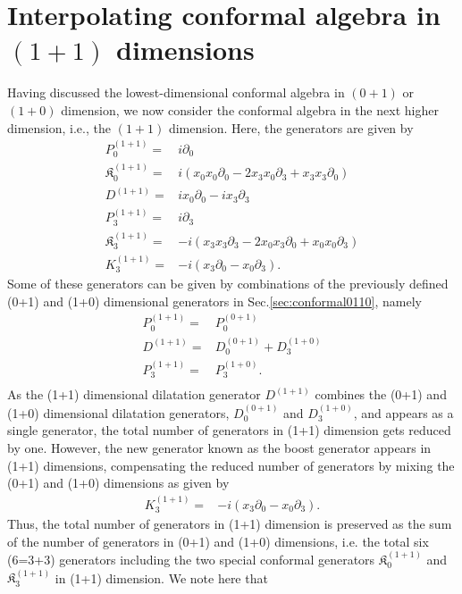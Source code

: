 \documentclass[%
 reprint,
superscriptaddress,
 amsmath,amssymb,
 aps,
]{revtex4-2}
\begin{document}
\section{Interpolating conformal algebra in \texorpdfstring{$(1+1)$}{Lg} dimensions}
\label{sec:conformal}
Having discussed the lowest-dimensional conformal algebra in $(0+1)$ or $(1+0)$ dimension, we now consider the conformal algebra in the next higher dimension, i.e., the $(1+1)$ dimension. Here, the generators are given by
\begin{align}
    P^{(1+1)}_{0}=&i\partial_{0}\\
    \mathfrak{K}^{(1+1)}_{{0}}=&i(x_{0}x_{0}\partial_{{0}}-2x_{3}x_{0}\partial_{3}+x_{3}x_{3}\partial_{0})\\
    D^{(1+1)}=&ix_{0}\partial_{0}-ix_{3}\partial_{3}\\
    P^{(1+1)}_{3}=&i\partial_{3}\\
    \mathfrak{K}^{(1+1)}_{{3}}=&-i(x_{3}x_{3}\partial_{{3}}-2x_{0}x_{3}\partial_{0}+x_{0}x_{0}\partial_{3})\\
    K_{3}^{(1+1)}=&-i(x_{3}\partial_{0}-x_{0}\partial_{3}).
\end{align}
Some of these generators can be given by 
combinations of the previously defined (0+1) and (1+0) dimensional generators in Sec.\ref{sec:conformal0110}, namely
\begin{align}
    P^{(1+1)}_{0}=&P^{(0+1)}_{0}\\
    D^{(1+1)}=&D^{(0+1)}_{0}+D^{(1+0)}_{3}\\
    P^{(1+1)}_{3}=&P^{(1+0)}_{3}.\\
\end{align}
As the (1+1) dimensional dilatation generator $D^{(1+1)}$ combines the (0+1) and (1+0) dimensional dilatation generators, $D^{(0+1)}_{0}$ and $D^{(1+0)}_{3}$, and appears as a single generator, the total number of generators in (1+1) dimension gets reduced by one. 
However, the new generator known as the boost generator appears in (1+1) dimensions, compensating the reduced number of generators by mixing the (0+1) and (1+0) dimensions as given by
\begin{align}
K_{3}^{(1+1)}=&-i(x_{3}\partial_{0}-x_{0}\partial_{3}).
\end{align}
Thus, the total number of generators in (1+1) dimension is preserved as the sum of the number of generators in (0+1) and (1+0) dimensions, i.e. the total six (6=3+3) generators including the two special conformal generators $\mathfrak{K}^{(1+1)}_{{0}}$ and $\mathfrak{K}^{(1+1)}_{{3}}$ in (1+1) dimension. We note here that 
\end{document}

